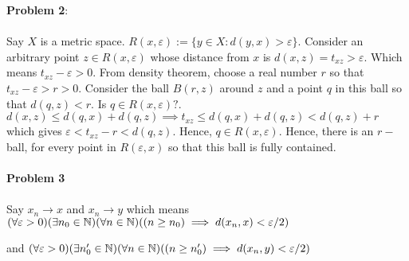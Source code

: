 \documentclass[../Main.tex]{subfiles}
\begin{document}
\textbf{Problem 2}:
\\\\ Say $X$ is a metric space. $R(x,\varepsilon):=\{y\in X: d(y,x)>\varepsilon\}$. Consider an arbitrary point $z \in R(x,\varepsilon)$ whose distance from $x$ is $d(x,z)=t_{xz}>\varepsilon$. Which means $t_{xz}-\varepsilon>0$. From density theorem, choose a real number $r$ so that $t_{xz}-\varepsilon>r>0$. Consider the ball $B(r,z)$ around $z$ and a point $q$ in this ball so that $d(q,z)<r$. Is $q \in R(x,\varepsilon)?$. $d(x,z)\leq d(q,x)+d(q,z) \implies t_{xz}\leq d(q,x)+d(q,z)<d(q,z)+r$ which gives $\varepsilon<t_{xz}-r<d(q,z)$. Hence, $q \in R(x,\varepsilon)$. Hence, there is an $r-$ball, for every point in $R(\varepsilon,x)$ so that this ball is fully contained.
\\\\ \textbf{Problem 3}
\\\\ Say $x_n \to x$ and $x_n \to y$ which means $(\forall \varepsilon>0)(\exists n_0 \in \mathbb N)(\forall n \in \mathbb N)((n \geq n_0) \implies d(x_n,x)<\varepsilon/2)$

and 
$(\forall \varepsilon>0)(\exists n_0' \in \mathbb N)(\forall n \in \mathbb N)((n \geq n_0') \implies d(x_n,y)<\varepsilon/2)$
\end{document}
